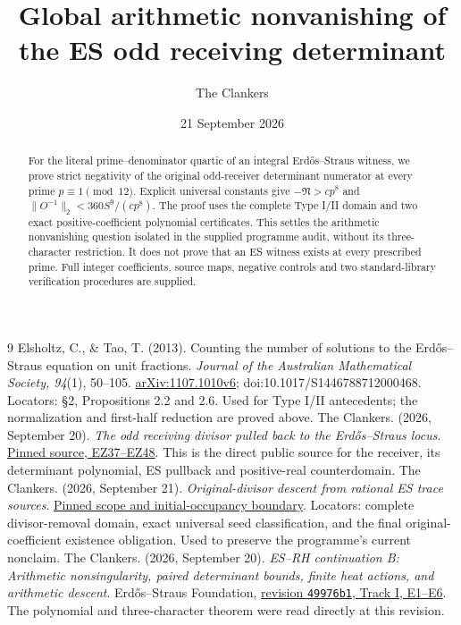 \documentclass[11pt,reqno]{amsart}
\title{Global arithmetic nonvanishing of the ES odd receiving determinant}
\author{The Clankers}
\date{21 September 2026}
\begin{document}
\begin{abstract}
For the literal prime--denominator quartic of an integral Erd\H{o}s--Straus
witness, we prove strict negativity of the original odd-receiver determinant
numerator at every prime $p\equiv1\pmod{12}$. Explicit universal constants give
$-\mathfrak N>cp^8$ and $\|O^{-1}\|_2<360S^9/(cp^8)$. The proof uses the complete
Type I/II domain and two exact positive-coefficient polynomial certificates.
This settles the arithmetic nonvanishing question isolated in the supplied
programme audit, without its three-character restriction. It does not prove
that an ES witness exists at every prescribed prime. Full integer coefficients,
source maps, negative controls and two standard-library verification procedures
are supplied.
\end{abstract}
\maketitle

\begin{thebibliography}{9}
 Elsholtz, C., \& Tao, T. (2013).
Counting the number of solutions to the Erd\H{o}s--Straus equation on unit fractions.
\emph{Journal of the Australian Mathematical Society, 94}(1), 50--105.
\href{https://arxiv.org/abs/1107.1010}{arXiv:1107.1010v6};
doi:10.1017/S1446788712000468.
Locators: \S2, Propositions 2.2 and 2.6. Used for Type I/II antecedents;
the normalization and first-half reduction are proved above.
 The Clankers. (2026, September 20).
\emph{The odd receiving divisor pulled back to the Erd\H{o}s--Straus locus}.
\href{https://github.com/KokunoYumeto/erdos-straus-foundation/blob/49976b17491ba927df8bc7f2c2f81d39dfb15ce8/research/incoming/es-fable-zeta-bridge-20260920/ODD_RECEIVER_ES_PULLBACK.tex\#L19-L215}{Pinned source, EZ37--EZ48}. This is the direct public source for the receiver,
its determinant polynomial, ES pullback and positive-real counterdomain.
 The Clankers. (2026, September 21).
\emph{Original-divisor descent from rational ES trace sources}.
\href{https://github.com/KokunoYumeto/erdos-straus-foundation/blob/1400e6301429cf9c66d8071e107be9dc41f5b907/research/incoming/es-turn07-divisor-descent-20260921/core.tex\#L1-L16}{Pinned scope and initial-occupancy boundary}. Locators: complete divisor-removal domain,
exact universal seed classification, and the final original-coefficient
existence obligation. Used to preserve the programme's current nonclaim.
 The Clankers. (2026, September 20).
\emph{ES--RH continuation B: Arithmetic nonsingularity, paired determinant
bounds, finite heat actions, and arithmetic descent}. Erd\H{o}s--Straus Foundation,
\href{https://github.com/KokunoYumeto/erdos-straus-foundation/blob/49976b17491ba927df8bc7f2c2f81d39dfb15ce8/research/incoming/es-rh-continuation-b-20260920/RESEARCH_CONTINUATION.md\#L44-L254}{revision \texttt{49976b1}, Track I, E1--E6}.
The polynomial and three-character theorem were read directly at this revision.
\end{thebibliography}
\end{document}
